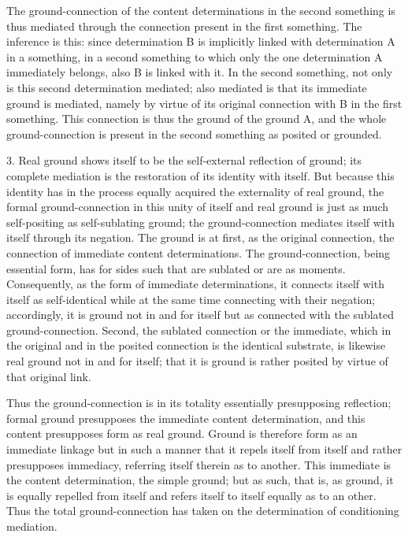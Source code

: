 The ground-connection of the content determinations
in the second something is thus mediated
through the connection present in the first something.
The inference is this:
since determination B is implicitly linked
with determination A in a something,
in a second something to which only
the one determination A immediately belongs,
also B is linked with it.
In the second something, not only is
this second determination mediated;
also mediated is that its immediate ground is mediated,
namely by virtue of its original connection
with B in the first something.
This connection is thus the ground of the ground A,
and the whole ground-connection is present in
the second something as posited or grounded.

3. Real ground shows itself to be the self-external reflection of ground;
its complete mediation is the restoration of its identity with itself.
But because this identity has in the process equally acquired
the externality of real ground,
the formal ground-connection in this unity
of itself and real ground is just as much
self-positing as self-sublating ground;
the ground-connection mediates itself with itself through its negation.
The ground is at first, as the original connection,
the connection of immediate content determinations.
The ground-connection, being essential form,
has for sides such that are sublated or are as moments.
Consequently, as the form of immediate determinations,
it connects itself with itself as self-identical
while at the same time connecting with their negation;
accordingly, it is ground not in and for itself
but as connected with the sublated ground-connection.
Second, the sublated connection or the immediate,
which in the original and in the posited connection
is the identical substrate, is likewise real ground
not in and for itself; that it is ground is
rather posited by virtue of that original link.

Thus the ground-connection is in its totality
essentially presupposing reflection;
formal ground presupposes the immediate content determination,
and this content presupposes form as real ground.
Ground is therefore form as an immediate linkage
but in such a manner that it repels itself from itself
and rather presupposes immediacy,
referring itself therein as to another.
This immediate is the content determination, the simple ground;
but as such, that is, as ground, it is equally repelled from itself
and refers itself to itself equally as to an other.
Thus the total ground-connection has taken on
the determination of conditioning mediation.

